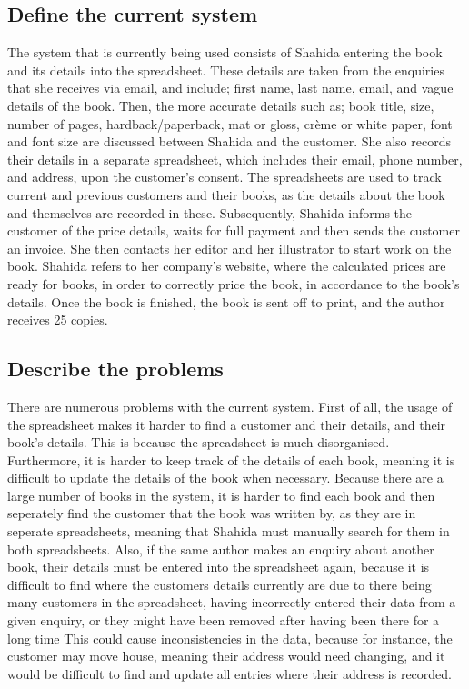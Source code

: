 \subsection{Define the current system}
The system that is currently being used consists of Shahida entering the book and its details into the spreadsheet. These details are taken from the enquiries that she receives via email, and include; first name, last name, email, and vague details of the book. Then, the more accurate details such as; book title, size, number of pages, hardback/paperback, mat or gloss, crème or white paper, font and font size are discussed between Shahida and the customer. She also records their details in a separate spreadsheet, which includes their email, phone number, and address, upon the customer's consent. The spreadsheets are used to track current and previous customers and their books, as the details about the book and themselves are recorded in these. Subsequently, Shahida informs the customer of the price details, waits for full payment and  then sends the customer an invoice. She then contacts her editor and her illustrator to start work on the book. Shahida refers to her company's website, where the calculated prices are ready for books, in order to correctly price the book, in accordance to the book’s details. Once the book is finished, the book is sent off to print, and the author receives 25 copies.

\subsection{Describe the problems}
There are numerous problems with the current system. First of all, the usage of the spreadsheet makes it harder to find a customer and their details, and their book’s details. This is because the spreadsheet is much disorganised. Furthermore, it is harder to keep track of the details of each book, meaning it is difficult to update the details of the book when necessary. Because there are a large number of books in the system, it is harder to find each book and then seperately find the customer that the book was written by, as they are in seperate spreadsheets, meaning that Shahida must manually search for them in both spreadsheets. Also, if the same author makes an enquiry about another book, their details must be entered into the spreadsheet again, because it is difficult to find where the customers details currently are due to there being many customers in the spreadsheet, having incorrectly entered their data from a given enquiry, or they might have been removed after having been there for a long time This could cause inconsistencies in the data, because for instance, the customer may move house, meaning their address would need changing, and it would be difficult to find and update all entries where their address is recorded. 

